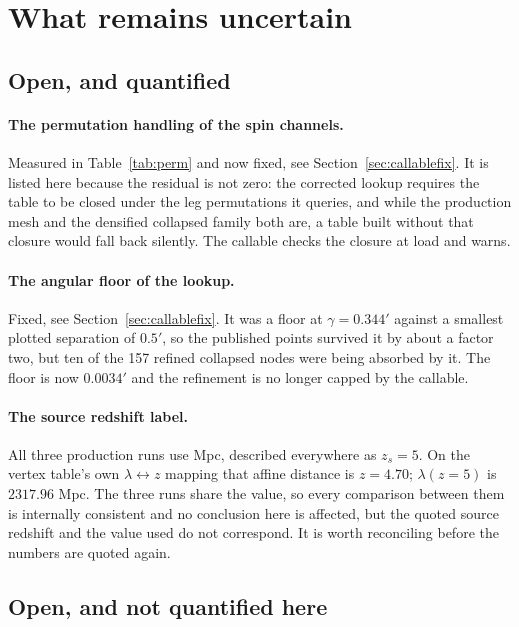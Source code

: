 \section{What remains uncertain}
\label{sec:uncertain}

\subsection{Open, and quantified}

\paragraph{The permutation handling of the spin channels.} Measured in
Table~\ref{tab:perm} and now fixed, see Section~\ref{sec:callablefix}. It
is listed here because the residual is not zero: the corrected lookup
requires the table to be closed under the leg permutations it queries, and
while the production mesh and the densified collapsed family both are, a
table built without that closure would fall back silently. The callable
checks the closure at load and warns.

\paragraph{The angular floor of the lookup.} Fixed, see
Section~\ref{sec:callablefix}. It was a floor at $\gamma = 0.344'$ against
a smallest plotted separation of $0.5'$, so the published points survived
it by about a factor two, but ten of the 157 refined collapsed nodes were
being absorbed by it. The floor is now $0.0034'$ and the refinement is no
longer capped by the callable.

\paragraph{The source redshift label.} All three production runs use
 Mpc, described everywhere as $z_s = 5$. On the
vertex table's own $\lambda\leftrightarrow z$ mapping that affine distance
is $z = 4.70$; $\lambda(z{=}5)$ is $2317.96$ Mpc. The three runs share the
value, so every comparison between them is internally consistent and no
conclusion here is affected, but the quoted source redshift and the value
used do not correspond. It is worth reconciling before the numbers are
quoted again.

\subsection{Open, and not quantified here}

